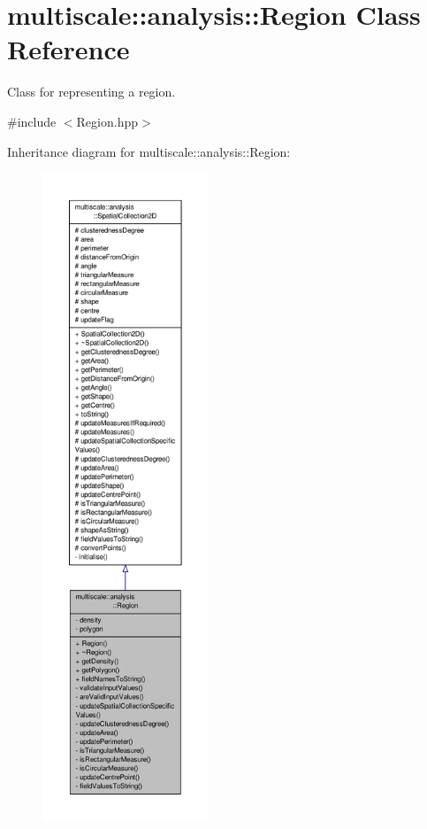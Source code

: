 \hypertarget{classmultiscale_1_1analysis_1_1Region}{\section{multiscale\-:\-:analysis\-:\-:Region Class Reference}
\label{classmultiscale_1_1analysis_1_1Region}
}


Class for representing a region.  




{\ttfamily \#include $<$Region.\-hpp$>$}



Inheritance diagram for multiscale\-:\-:analysis\-:\-:Region\-:
\nopagebreak
\begin{figure}[H]
\begin{center}
\leavevmode
\includegraphics[height=550pt]{classmultiscale_1_1analysis_1_1Region__inherit__graph}
\end{center}
\end{figure}


